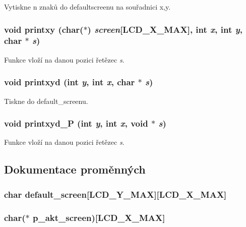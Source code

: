 Vytiskne n znaků do defaultscreenu na souřadnici x,y. 
\subsubsection[{printxy}]{\setlength{\rightskip}{0pt plus 5cm}void printxy (char($\ast$) {\em screen}[LCD\_\-X\_\-MAX], \/  int {\em x}, \/  int {\em y}, \/  char $\ast$ {\em s})}\label{lcd_8h_a753417a54b9788480a2d26716cde2a71}


Funkce vloží na danou pozici řetězec {\itshape s\/}. 
\subsubsection[{printxyd}]{\setlength{\rightskip}{0pt plus 5cm}void printxyd (int {\em y}, \/  int {\em x}, \/  char $\ast$ {\em s})}\label{lcd_8h_af14cee58cda35b9331b261be186b3dd9}


Tiskne do default\_\-screenu. 
\subsubsection[{printxyd\_\-P}]{\setlength{\rightskip}{0pt plus 5cm}void printxyd\_\-P (int {\em y}, \/  int {\em x}, \/  void $\ast$ {\em s})}\label{lcd_8h_ac49e278f3e1c0c3472a70b8c6efc5051}


Funkce vloží na danou pozici řetězec {\itshape s\/}. 

\subsection{Dokumentace proměnných}
\subsubsection[{default\_\-screen}]{\setlength{\rightskip}{0pt plus 5cm}char {\bf default\_\-screen}[LCD\_\-Y\_\-MAX][LCD\_\-X\_\-MAX]}\label{lcd_8h_a461f2d625bd30828c33677c4c500f3a2}
\subsubsection[{p\_\-akt\_\-screen}]{\setlength{\rightskip}{0pt plus 5cm}char($\ast$ {\bf p\_\-akt\_\-screen})[LCD\_\-X\_\-MAX]}\label{lcd_8h_a29229a718c28cd99acb4cb22eed55c33}
